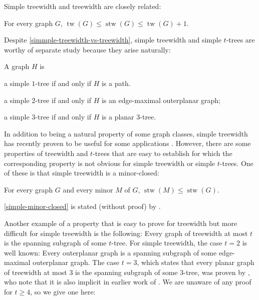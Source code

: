 \documentclass[kpfonts]{patmorin}
\DeclareMathOperator{\tw}{tw}
\DeclareMathOperator{\stw}{stw}
\theoremstyle{named}
\begin{document}
Simple treewidth and treewidth are closely related:

\begin{lem}\label{simple-treewidth-vs-treewidth}\cite{knauer.ueckerdt:simple}
    For every graph $G$, $\tw(G)\le \stw(G)\le \tw(G)+1$.
\end{lem}

Despite \cref{simmple-treewidth-vs-treewidth}, simple treewidth and simple $t$-trees are worthy of separate study because they arise naturally:

\begin{lem}\label{simple-small-cases}
    A graph $H$ is
    \begin{compactenum}[(i)]
        \item a simple $1$-tree if and only if $H$ is a path.
        \item a simple $2$-tree if and only if $H$ is an edge-maximal outerplanar graph;
        \item a simple $3$-tree if and only if $H$ is a planar 3-tree.
    \end{compactenum}
\end{lem}

In addition to being a natural property of some graph classes, simple treewidth has recently proven to be useful for some applications \cite{X}. However, there are some properties of treewidth and $t$-trees that are easy to establish for which the corresponding property is not obvious for simple treewidth or simple $t$-trees.  One of these is that simple treewidth is a minor-closed:

\begin{lem}\label{simple-minor-closed}
    For every graph $G$ and every minor $M$ of $G$, $\stw(M)\le\stw(G)$.
\end{lem}

\cref{simple-minor-closed} is stated (without proof) by \citet{knauer.ueckerdt:simple}.

Another example of a property that is easy to prove for treewidth but more difficult for simple treewidth is the following:  Every graph of treewidth at most $t$ is the spanning subgraph of some $t$-tree.  For simple treewidth, the case $t=2$ is well known: Every outerplanar graph is a spanning subgraph of some edge-maximal outerplanar graph.  The case $t=3$, which states that every planar graph of treewidth at most 3 is the spanning subgraph of some $3$-tree, was proven by \citet{kratochvil.vaner:note}, who note that it is also implicit in earlier work of \citet{elmallah.colbourn:on}.  We are unaware of any proof for $t\ge 4$, so we give one here:
\end{document}
